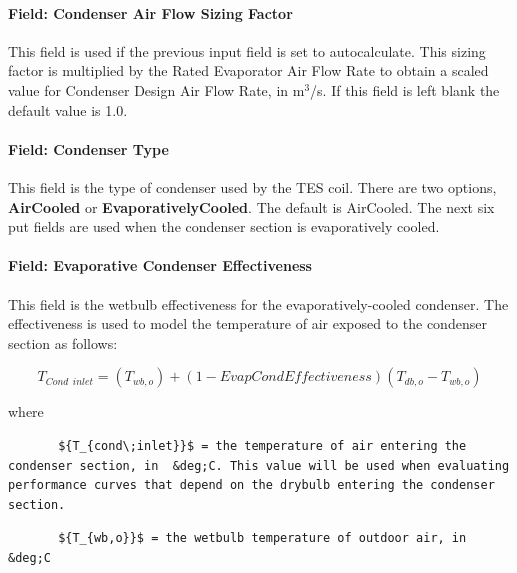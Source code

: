 \paragraph{Field: Condenser Air Flow Sizing Factor}\label{field-condenser-air-flow-sizing-factor}

This field is used if the previous input field is set to autocalculate. This sizing factor is multiplied by the Rated Evaporator Air Flow Rate to obtain a scaled value for Condenser Design Air Flow Rate, in m\(^{3}\)/s. If this field is left blank the default value is 1.0.

\paragraph{Field: Condenser Type}\label{field-condenser-type-5}

This field is the type of condenser used by the TES coil. There are two options, \textbf{AirCooled} or \textbf{EvaporativelyCooled}. The default is AirCooled. The next six put fields are used when the condenser section is evaporatively cooled.

\paragraph{Field: Evaporative Condenser Effectiveness}\label{field-evaporative-condenser-effectiveness-2}

This field is the wetbulb effectiveness for the evaporatively-cooled condenser. The effectiveness is used to model the temperature of air exposed to the condenser section as follows:

\begin{equation}
{T_{Cond\,\;inlet}} = \left( {{T_{wb,o}}} \right) + \left( {1 - EvapCondEffectiveness} \right)\left( {{T_{db,o}} - {T_{wb,o}}} \right)
\end{equation}

where

\begin{lstlisting}
       ${T_{cond\;inlet}}$ = the temperature of air entering the condenser section, in  &deg;C. This value will be used when evaluating performance curves that depend on the drybulb entering the condenser section.
\end{lstlisting}

\begin{lstlisting}
       ${T_{wb,o}}$ = the wetbulb temperature of outdoor air, in  &deg;C
\end{lstlisting}

